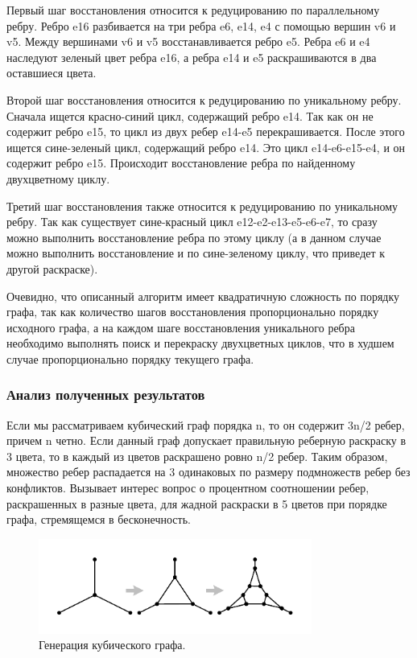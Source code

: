 Первый шаг восстановления относится к редуцированию по параллельному ребру. Ребро e16 разбивается на три ребра e6, e14, e4 с помощью вершин v6 и v5.
Между вершинами v6 и v5 восстанавливается ребро e5.
Ребра e6 и e4 наследуют зеленый цвет ребра e16, а ребра e14 и e5 раскрашиваются в два оставшиеся цвета.

Второй шаг восстановления относится к редуцированию по уникальному ребру.
Сначала ищется красно-синий цикл, содержащий ребро e14. Так как он не содержит ребро e15, то цикл из двух ребер e14-e5 перекрашивается.
После этого ищется сине-зеленый цикл, содержащий ребро e14.
Это цикл e14-e6-e15-e4, и он содержит ребро e15.
Происходит восстановление ребра по найденному двухцветному циклу.

Третий шаг восстановления также относится к редуцированию по уникальному ребру.
Так как существует сине-красный цикл e12-e2-e13-e5-e6-e7, то сразу можно выполнить восстановление ребра по этому циклу (а в данном случае можно выполнить восстановление и по сине-зеленому циклу, что приведет к другой раскраске).

Очевидно, что описанный алгоритм имеет квадратичную сложность по порядку графа, так как количество шагов восстановления пропорционально порядку исходного графа, а на каждом шаге восстановления уникального ребра необходимо выполнять поиск и перекраску двухцветных циклов, что в худшем случае пропорционально порядку текущего графа.

\subsubsection{Анализ полученных результатов}

Если мы рассматриваем кубический граф порядка n, то он содержит 3n/2 ребер, причем n четно.
Если данный граф допускает правильную реберную раскраску в 3 цвета, то в каждый из цветов раскрашено ровно n/2 ребер.
Таким образом, множество ребер распадается на 3 одинаковых по размеру подмножеств ребер без конфликтов.
Вызывает интерес вопрос о процентном соотношении ребер, раскрашенных в разные цвета, для жадной раскраски в 5 цветов при порядке графа, стремящемся в бесконечность.

\begin{figure}[ht]
\centering
\includegraphics[width=0.8\textwidth]{./pics/text_3_edge_coloring/9-bubble.pdf}
\singlespacing
{}\caption{Генерация кубического графа.}
\label{fig:text_3_edge_coloring_9}
\end{figure}

